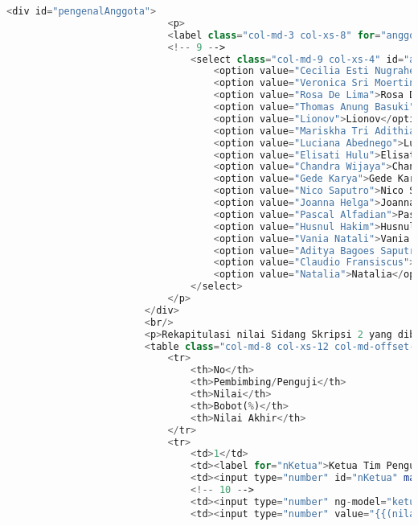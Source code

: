 \begin{lstlisting}[language=PHP,basicstyle=\tiny,caption=skripsi.php]
						<div id="pengenalAnggota">
							<p>
							<label class="col-md-3 col-xs-8" for="anggota">Anggota Tim Penguji:</label>
							<!-- 9 -->
								<select class="col-md-9 col-xs-4" id="anggota" name="namaAnggotaTimPenguji" ng-model="namaAnggotaTimPenguji">
									<option value="Cecilia Esti Nugraheni">Cecilia Esti Nugraheni</option>
									<option value="Veronica Sri Moertini">Veronica Sri Moertini</option>
									<option value="Rosa De Lima">Rosa De Lima</option>
									<option value="Thomas Anung Basuki">Thomas Anung Basuki</option>
									<option value="Lionov">Lionov</option>
									<option value="Mariskha Tri Adithia">Mariskha Tri Adithia</option>
									<option value="Luciana Abednego">Luciana Abednego</option>
									<option value="Elisati Hulu">Elisati Hulu</option>
									<option value="Chandra Wijaya">Chandra Wijaya</option>
									<option value="Gede Karya">Gede Karya</option>
									<option value="Nico Saputro">Nico Saputro</option>
									<option value="Joanna Helga">Joanna Helga</option>
									<option value="Pascal Alfadian">Pascal Alfadian</option>
									<option value="Husnul Hakim">Husnul Hakim</option>
									<option value="Vania Natali">Vania Natali</option>
									<option value="Aditya Bagoes Saputra">Aditya Bagoes Saputra</option>
									<option value="Claudio Fransiscus">Claudio Fransiscus</option>
									<option value="Natalia">Natalia</option>
								</select>
							</p>
						</div>
						<br/>
						<p>Rekapitulasi nilai Sidang Skripsi 2 yang diberikan oleh pembimbing, penguji & koordinator skripsi:</p>
						<table class="col-md-8 col-xs-12 col-md-offset-4 col-md-pull-2 table-responsive">
							<tr>
								<th>No</th>
								<th>Pembimbing/Penguji</th>
								<th>Nilai</th>
								<th>Bobot(%)</th>
								<th>Nilai Akhir</th>
							</tr>
							<tr>
								<td>1</td>
								<td><label for="nKetua">Ketua Tim Penguji</label></td>
								<td><input type="number" id="nKetua" max="100" ng-model="nilai_ketua" class="form-nilai" value="{{nilai_TTLaporanK * TTLaporanK.value / 100 + nilai_KMateriK * KMateriK.value / 100 + nilai_PMateriK * PMateriK.value / 100 + nilai_PresentasiK * presentasiK.value / 100 + nilai_PTujuanK * PTujuanK.value / 100}}" disabled="disabled" /></td>
								<!-- 10 -->
								<td><input type="number" ng-model="ketua.value" ng-init="ketua.value = 35" min="0" max="100" class="form-nilai" name="bobotKetuaTimPenguji" readonly="readonly" /></td>
								<td><input type="number" value="{{(nilai_TTLaporanK * TTLaporanK.value / 100 + nilai_KMateriK * KMateriK.value / 100 + nilai_PMateriK * PMateriK.value / 100 + nilai_PresentasiK * presentasiK.value / 100 + nilai_PTujuanK * PTujuanK.value / 100) * ketua.value / 100}}" ng-model="total_ketua" class="form-nilai" disabled="disabled" /></td>

\end{lstlisting}
